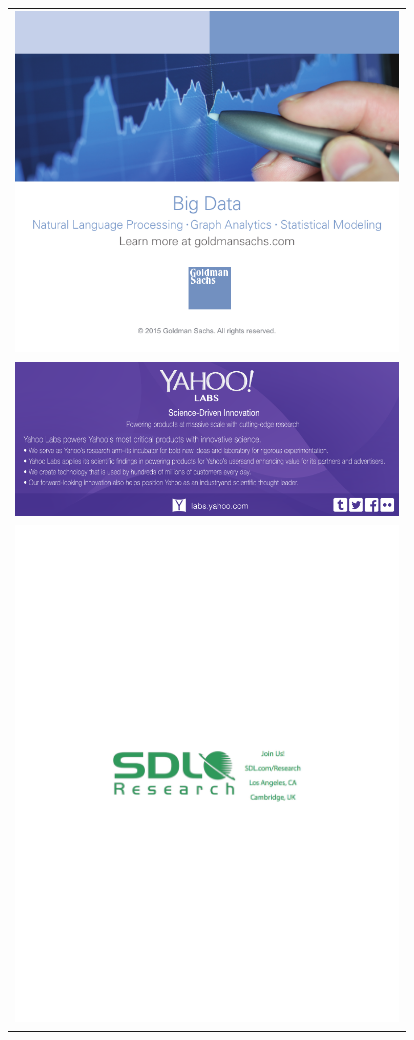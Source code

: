 \thispagestyle{empty}
\thispagestyle{empty}
\begin{center}
\begin{tabular}{c}
  \includegraphics[width=4in]{content/ads/gold/goldman_sachs.pdf} \\
  \includegraphics[width=4in]{content/ads/bronze/yahoo_labs.pdf} \\
  \includegraphics[width=4in]{content/ads/silver/sdl_research.pdf} \\
\end{tabular}
\end{center}

